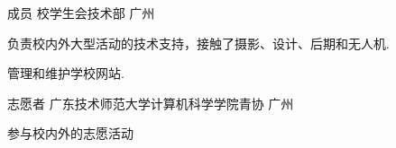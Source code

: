 

\begin{cventries}

  \cventry
    {成员} %
    {校学生会技术部} %
    {广州} %
    {} %
    {
      \begin{cvitems} %
        \item {负责校内外大型活动的技术支持，接触了摄影、设计、后期和无人机.}
        \item {管理和维护学校网站.}
      \end{cvitems}
    }

  \cventry
    {志愿者} %
    {广东技术师范大学计算机科学学院青协} %
    {广州} %
    {} %
    {
      \begin{cvitems} %
        \item {参与校内外的志愿活动}
      \end{cvitems}
    }

\end{cventries}
